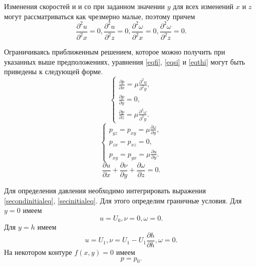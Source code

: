 \documentclass[12pt, a4paper]{article}
\begin{document}
Изменения скоростей и и со при заданном значении $y$ для всех изменений $ x $ и $z$ могут рассматриваться как чрезмерно малые, поэтому причем
\[
\frac{\partial^2 u}{\partial^2 x} = 0, 
\frac{\partial^2 u}{\partial^2 z} = 0, 
\frac{\partial^2 \omega}{\partial^2 x} = 0, 
\frac{\partial^2 \omega}{\partial^2 z} = 0. 
\]

Ограничиваясь приближенным решением, которое можно
получить при указанных выше предположениях, уравнения \eqref{eqfi}, \eqref{eqsi} и \eqref{eqthi} могут быть приведены к следующей форме.
\begin{equation}
	\label{secondinitialeq}
	\begin{cases}
		\frac{\partial p }{\partial x} = \mu \frac{\partial^2 u}{\partial^2 y}, \\
		\frac{\partial p }{\partial y} = 0, \\
		\frac{\partial p }{\partial z} = \mu \frac{\partial^2 \omega}{\partial^2 y}.
	\end{cases}
\end{equation}
\begin{equation}
	\label{secinitialeq}
	\begin{cases}
		p_{yz} = p_{xy} = \mu \frac{\partial \omega}{\partial y}, \\
		p_{zx} = p_{xz} = 0, \\
		p_{xy} = p_{yx} = \mu \frac{\partial u}{\partial y}.
	\end{cases}
\end{equation}
\begin{equation*}
	\frac{\partial u}{\partial x} + \frac{\partial \nu}{\partial y} + \frac{\partial \omega}{\partial z} = 0.
\end{equation*}

Для определения давления необходимо интегрировать выражения \eqref{secondinitialeq}, \eqref{secinitialeq}. Для этого определим граничные условия.
Для $y = 0$ имеем
\[
u = U_0, \nu = 0, \omega = 0.
\]
Для $y = h$ имеем
\[
u = U_1, \nu = U_1 - U_1 \frac{\partial  h}{\partial h}, \omega = 0.
\]
На некотором контуре $f(x, y) = 0$ имеем
\[
p = p_0.
\]
\end{document}
